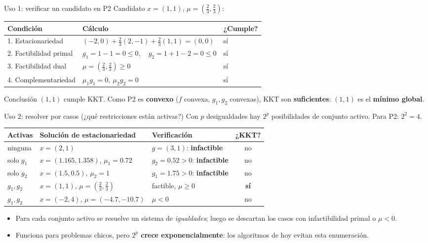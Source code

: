 \documentclass[aspectratio=169]{beamer}
\begin{document}
\begin{frame}{Uso 1: verificar un candidato en P2}
  Candidato $x=(1,1)$, $\mu=(\tfrac23,\tfrac23)$:
  \begin{center}\small
  \begin{tabular}{lll}
    \toprule
    Condición & Cálculo & ¿Cumple?\\
    \midrule
    1. Estacionariedad & $(-2,0)+\tfrac23(2,-1)+\tfrac23(1,1)=(0,0)$ & sí\\
    2. Factibilidad primal & $g_1=1-1=0\le0,\quad g_2=1+1-2=0\le0$ & sí\\
    3. Factibilidad dual & $\mu=(\tfrac23,\tfrac23)\ge0$ & sí\\
    4. Complementariedad & $\mu_1g_1=0,\ \mu_2g_2=0$ & sí\\
    \bottomrule
  \end{tabular}
  \end{center}
  \begin{alertblock}{Conclusión}
    $(1,1)$ cumple KKT. Como P2 es \textbf{convexo} ($f$ convexa, $g_1,g_2$ convexas), KKT son \textbf{suficientes}: $(1,1)$ es el \textbf{mínimo global}.
  \end{alertblock}
\end{frame}

\begin{frame}{Uso 2: resolver por casos (¿qué restricciones están activas?)}
  Con $p$ desigualdades hay $2^p$ posibilidades de conjunto activo. Para P2: $2^2=4$.
  \begin{center}\small
  \begin{tabular}{llp{4.6cm}c}
    \toprule
    Activas & Solución de estacionariedad & Verificación & ¿KKT?\\
    \midrule
    ninguna & $x=(2,1)$ & $g=(3,1)$: \textbf{infactible} & no\\
    solo $g_1$ & $x=(1.165,1.358)$, $\mu_1=0.72$ & $g_2=0.52>0$: \textbf{infactible} & no\\
    solo $g_2$ & $x=(1.5,0.5)$, $\mu_2=1$ & $g_1=1.75>0$: \textbf{infactible} & no\\
    $g_1,g_2$ & $x=(1,1)$, $\mu=(\tfrac23,\tfrac23)$ & factible, $\mu\ge0$ & \textbf{sí}\\
    $g_1,g_2$ & $x=(-2,4)$, $\mu=(-4.7,-10.7)$ & $\mu<0$ & no\\
    \bottomrule
  \end{tabular}
  \end{center}
  \begin{itemize}
    \item Para cada conjunto activo se resuelve un sistema de \emph{igualdades}; luego se descartan los casos con infactibilidad primal o $\mu<0$.
    \item Funciona para problemas chicos, pero \textbf{$2^p$ crece exponencialmente}: los algoritmos de hoy evitan esta enumeración.
  \end{itemize}
\end{frame}
\end{document}
